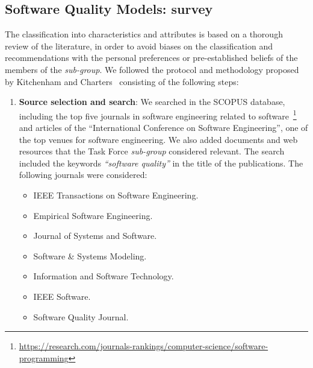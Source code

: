 \documentclass[a4paper]{article}
\begin{document}
\subsection{Software Quality Models: survey}
\label{subsec:sqm_survey}

The classification into characteristics and attributes is based on a thorough review of the literature, in order to avoid biases on the classification and recommendations with the personal preferences or pre-established beliefs of the members of the \textit{sub-group}. We followed the protocol and methodology proposed by Kitchenham and Charters~\cite{keele2007guidelines} consisting of the following steps:

\begin{enumerate}
    \item \textbf{Source selection and search}: We searched in the SCOPUS database, including the top five journals in software engineering related to software~\footnote{\url{https://research.com/journals-rankings/computer-science/software-programming}} and articles of the  ``International Conference on Software Engineering'', one of the top venues for software engineering. We also added documents and web resources that the Task Force \textit{sub-group} considered relevant. The search included the keywords \textit{``software quality''} in the title of the publications. The following journals were considered:

    \begin{itemize}
        \item IEEE Transactions on Software Engineering.
        \item Empirical Software Engineering.
        \item Journal of Systems and Software.
        \item Software \& Systems Modeling.
        \item Information and Software Technology.
        \item IEEE Software.
        \item Software Quality Journal.
    \end{itemize}


\end{enumerate}
\end{document}
